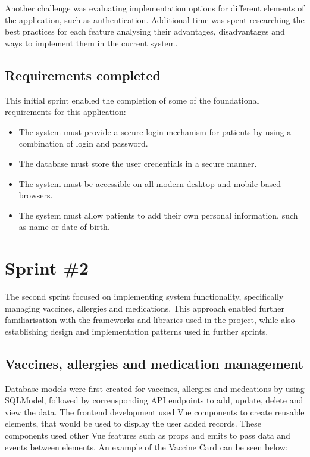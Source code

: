 Another challenge was evaluating implementation options for different elements of the application, such as authentication. Additional time was spent researching the best practices for each feature \- analysing their advantages, disadvantages and ways to implement them in the current system.

\subsection{Requirements completed}

This initial sprint enabled the completion of some of the foundational requirements for this application:

\begin{itemize}
    \item The system must provide a secure login mechanism for patients by using a combination of login and password.
    \item The database must store the user credentials in a secure manner.
    \item The system must be accessible on all modern desktop and mobile-based browsers.
    \item The system must allow patients to add their own personal information, such as name or date of birth.
\end{itemize}

\section{Sprint \#2}

The second sprint focused on implementing system functionality, specifically managing vaccines, allergies and medications. This approach enabled further familiarisation with the frameworks and libraries used in the project, while also establishing design and implementation patterns used in further sprints.

\subsection{Vaccines, allergies and medication management}

Database models were first created for vaccines, allergies and medcations by using SQLModel, followed by corrensponding API endpoints to add, update, delete and view the data. The frontend development used Vue components to create reusable elements, that would be used to display the user added records. These components used other Vue features such as props and emits to pass data and events between elements. An example of the Vaccine Card can be seen below:

